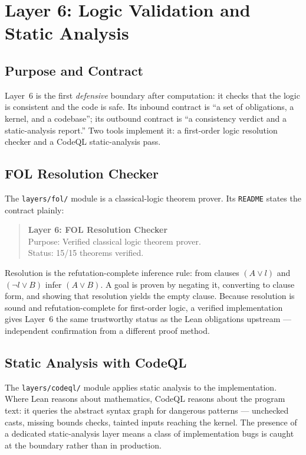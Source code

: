 \chapter{Layer 6: Logic Validation and Static Analysis}
\label{ch:static}

\section{Purpose and Contract}
\label{sec:static-purpose}

Layer~6 is the first \emph{defensive} boundary after computation: it checks
that the logic is consistent and the code is safe. Its inbound contract is
``a set of obligations, a kernel, and a codebase''; its outbound contract is
``a consistency verdict and a static-analysis report.'' Two tools implement
it: a first-order logic resolution checker and a CodeQL static-analysis
pass.

\section{FOL Resolution Checker}
\label{sec:static-fol}

The \texttt{layers/fol/} module is a classical-logic theorem prover. Its
\texttt{README} states the contract plainly:
\begin{quote}
\textbf{Layer 6: FOL Resolution Checker} \\
Purpose: Verified classical logic theorem prover. \\
Status: 15/15 theorems verified.
\end{quote}
Resolution is the refutation-complete inference rule: from clauses
$(A \lor l)$ and $(\neg l \lor B)$ infer $(A \lor B)$. A goal is proven by
negating it, converting to clause form, and showing that resolution yields the
empty clause. Because resolution is sound and refutation-complete for
first-order logic, a verified implementation gives Layer~6 the same
trustworthy status as the Lean obligations upstream --- independent confirmation
from a different proof method.

\section{Static Analysis with CodeQL}
\label{sec:static-codeql}

The \texttt{layers/codeql/} module applies static analysis to the
implementation. Where Lean reasons about mathematics, CodeQL reasons about
the program text: it queries the abstract syntax graph for dangerous patterns
--- unchecked casts, missing bounds checks, tainted inputs reaching the kernel.
The presence of a dedicated static-analysis layer means a class of
implementation bugs is caught at the boundary rather than in production.

